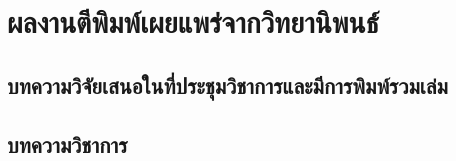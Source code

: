 \chapter{ผลงานตีพิมพ์เผยแพร่จากวิทยานิพนธ์}
\section{บทความวิจัยเสนอในที่ประชุมวิชาการและมีการพิมพ์รวมเล่ม}
  
% 


\section{บทความวิชาการ}
  
% 

